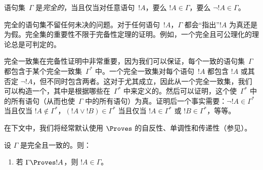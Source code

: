 \documentclass[../../../include/open-logic-section]{subfiles}
\begin{document}
      {}
      {}


\begin{defn}[完全集]
 语句集~$\Gamma$ 是\emph{完全的}，当且仅当对任意语句~$!A$，要么 $!A \in \Gamma$，要么 $\lnot !A \in \Gamma$。
\end{defn}

\begin{explain}
完全的语句集不留任何未决的问题。对于任何语句~$!A$，$\Gamma$ 都会“指出”$!A$ 为真还是为假。完全集的重要性不限于完备性定理的证明。例如，一个完全且可公理化的理论总是可判定的。
\end{explain}

\begin{explain}
完全一致集在完备性证明中非常重要，因为我们可以保证，每个一致的语句集~$\Gamma$ 都包含于某个完全一致集~$\Gamma^*$ 中。一个完全一致集对每个语句~$!A$ 都包含 $!A$ 或其否定 $\lnot !A$，但不同时包含两者。这对于尤其成立，因此从一个完全一致集，我们可以构造一个，其中是根据哪些在~$\Gamma^*$ 中来定义的。然后可以证明，这个使~$\Gamma^*$ 中的所有语句（从而也使~$\Gamma$ 中的所有语句）为真。证明后一个事实需要：$\lnot !A \in \Gamma^*$ 当且仅当 $!A \notin \Gamma^*$，$(!A \lor !B) \in
\Gamma^*$ 当且仅当 $!A \in \Gamma^*$ 或 $!B \in \Gamma^*$，等等。
\end{explain}

在下文中，我们将经常默认使用 $\Proves$ 的自反性、单调性和传递性（参见）。

\begin{prop}
设 $\Gamma$ 是完全且一致的。则：
\begin{enumerate}
\item {} 若 $\Gamma \Proves !A$，则 $!A \in \Gamma$。



\end{enumerate}
\end{prop}
\end{document}
